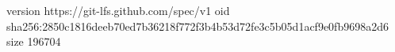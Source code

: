 version https://git-lfs.github.com/spec/v1
oid sha256:2850c1816deeb70ed7b36218f772f3b4b53d72fe3c5b05d1acf9e0fb9698a2d6
size 196704
